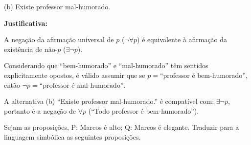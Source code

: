 \documentclass[12pt, a4paper, onecolumn]{exam}
\begin{document}
\begin{questions}
    
    \begin{solution}
        (b) Existe professor mal-humorado.

        \textbf{Justificativa:}
        
        A negação da afirmação universal de \(p\) (\( \neg \forall p \)) é equivalente à afirmação da existência de não-\(p\) (\( \exists \neg p \)).

       Considerando que “bem-humorado” e “mal-humorado” têm sentidos explicitamente opostos, é válido assumir que se \(p = \text{“professor é bem-humorado”} \), então \( \neg p = \text{“professor é mal-humorado”} \).

        A alternativa (b) “Existe professor mal-humorado.” é compatível com: \( \exists \neg p \), portanto é a negação de \(\forall p\) (“Todo professor é bem-humorado”).
        
    \end{solution}

    \pagebreak
    
    \question[q3] Sejam as proposições, P: Marcos é alto; Q: Marcos é elegante. Traduzir para a linguagem simbólica as seguintes proposições. 
    
\end{questions}
\end{document}
